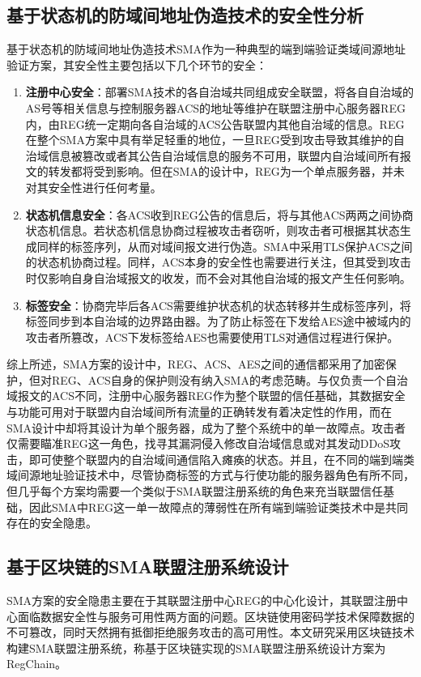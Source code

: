     \subsection{基于状态机的防域间地址伪造技术的安全性分析}
    \label{IPv6_Security:interas:problem}
    基于状态机的防域间地址伪造技术SMA作为一种典型的端到端验证类域间源地址验证方案，其安全性主要包括以下几个环节的安全：
    \begin{enumerate}[1{)}]
      \item \textbf{注册中心安全}：部署SMA技术的各自治域共同组成安全联盟，将各自自治域的AS号等相关信息与控制服务器ACS的地址等维护在联盟注册中心服务器REG内，由REG统一定期向各自治域的ACS公告联盟内其他自治域的信息。REG在整个SMA方案中具有举足轻重的地位，一旦REG受到攻击导致其维护的自治域信息被篡改或者其公告自治域信息的服务不可用，联盟内自治域间所有报文的转发都将受到影响。但在SMA的设计中，REG为一个单点服务器，并未对其安全性进行任何考量。
      \item \textbf{状态机信息安全}：各ACS收到REG公告的信息后，将与其他ACS两两之间协商状态机信息。若状态机信息协商过程被攻击者窃听，则攻击者可根据其状态生成同样的标签序列，从而对域间报文进行伪造。SMA中采用TLS保护ACS之间的状态机协商过程。同样，ACS本身的安全性也需要进行关注，但其受到攻击时仅影响自身自治域报文的收发，而不会对其他自治域的报文产生任何影响。
      \item \textbf{标签安全}：协商完毕后各ACS需要维护状态机的状态转移并生成标签序列，将标签同步到本自治域的边界路由器。为了防止标签在下发给AES途中被域内的攻击者所篡改，ACS下发标签给AES也需要使用TLS对通信过程进行保护。
    \end{enumerate}

    综上所述，SMA方案的设计中，REG、ACS、AES之间的通信都采用了加密保护，但对REG、ACS自身的保护则没有纳入SMA的考虑范畴。与仅负责一个自治域报文的ACS不同，注册中心服务器REG作为整个联盟的信任基础，其数据安全与功能可用对于联盟内自治域间所有流量的正确转发有着决定性的作用，而在SMA设计中却将其设计为单个服务器，成为了整个系统中的单一故障点。攻击者仅需要瞄准REG这一角色，找寻其漏洞侵入修改自治域信息或对其发动DDoS攻击，即可使整个联盟内的自治域间通信陷入瘫痪的状态。并且，在不同的端到端类域间源地址验证技术中，尽管协商标签的方式与行使功能的服务器角色有所不同，但几乎每个方案均需要一个类似于SMA联盟注册系统的角色来充当联盟信任基础，因此SMA中REG这一单一故障点的薄弱性在所有端到端验证类技术中是共同存在的安全隐患。

    \subsection{基于区块链的SMA联盟注册系统设计}
    \label{IPv6_Security:interas:design}
    SMA方案的安全隐患主要在于其联盟注册中心REG的中心化设计，其联盟注册中心面临数据安全性与服务可用性两方面的问题。区块链使用密码学技术保障数据的不可篡改，同时天然拥有抵御拒绝服务攻击的高可用性。本文研究采用区块链技术构建SMA联盟注册系统，称基于区块链实现的SMA联盟注册系统设计方案为RegChain。

